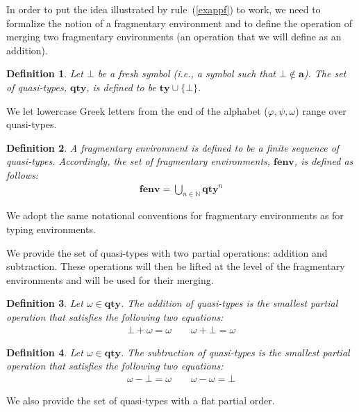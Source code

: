 \documentclass[submission,creativecommons]{eptcs}
\newtheorem{definition}{Definition}
\newcommand{\bt}{{\scriptstyle\bot}}
\newcommand{\ty}{\mathord{\mathbf{ty}}}
\newcommand{\qty}{\mathord{\mathbf{qty}}}
\newcommand{\aty}{\mathord{\mathbf{a}}}
\newcommand{\fenv}{\mathord{\mathbf{fenv}}}
\begin{document}
In order to put the idea illustrated by rule~(\ref{exappf}) to work, we need to formalize the notion of a
fragmentary environment and to define the operation of merging two fragmentary environments (an operation that
we will define as an addition).

\begin{definition}
Let $\bt$ be a fresh symbol (i.e., a symbol such that $\bt\not\in\aty$).
The set of quasi-types, $\qty$, is defined to be $\ty \cup \{\bt\}$. 
\end{definition}

We let lowercase Greek letters from the end of the alphabet ($\varphi, \psi, \omega$) range over quasi-types.

\begin{definition}
A fragmentary environment is defined to be a finite sequence of quasi-types.
Accordingly, the set of fragmentary environments, $\fenv$, is defined as follows:
\begin{align*}
\fenv = \bigcup_{n\in\mathbb{N}} \qty^n
\end{align*}
\end{definition}

We adopt the same notational conventions for fragmentary environments as for typing environments.

We provide the set of quasi-types with two partial operations: addition and subtraction.
These operations will then be lifted at the level of the fragmentary environments and will be used for their
merging.

\begin{definition}
Let $\omega \in \qty$. The addition of quasi-types is the smallest partial operation that satisfies the
following two equations:
\begin{align*}
  \bt + \omega = \omega \quad\quad
  \omega + \bt = \omega
\end{align*}
\end{definition}

\begin{definition}
Let $\omega \in \qty$. The subtraction of quasi-types is the smallest partial operation that satisfies the
following two equations:
\begin{align*}
  \omega - \bt = \omega \quad\quad
  \omega - \omega = \bt
\end{align*}
\end{definition}

We also provide the set of quasi-types with a flat partial order.
\end{document}
